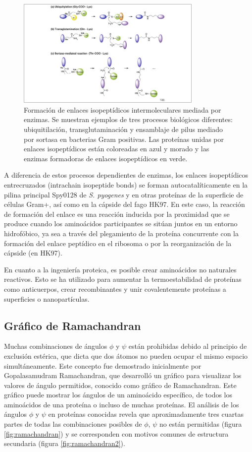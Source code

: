 \begin{figure}[h]
\centering
\includegraphics[width = 0.8\textwidth]{figs/iso.jpg}
\caption{Formación de enlaces isopeptídicos intermoleculares mediada por enzimas. Se muestran ejemplos de tres procesos biológicos diferentes: ubiquitilación, transglutaminación y ensamblaje de pilus mediado por sortasa en bacterias Gram positivas. Las proteínas unidas por enlaces isopeptídicos están coloreadas en azul y morado y las enzimas formadoras de enlaces isopeptídicos en verde.}
\label{fig:iso}
\end{figure}

A diferencia de estos procesos dependientes de enzimas, los enlaces isopeptídicos entrecruzados (intrachain isopeptide bonds) se forman autocatalíticamente en la pilina principal Spy0128 de \textit{S. pyogenes} y en otras proteínas de la superficie de células Gram+, así como en la cápside del fago HK97. En este caso, la reacción de formación del enlace es una reacción inducida por la proximidad que se produce cuando los aminoácidos participantes se sitúan juntos en un entorno hidrofóbico, ya sea a través del plegamiento de la proteína concurrente con la formación del enlace peptídico en el ribosoma o por la reorganización de la cápside (en HK97).

En cuanto a la ingeniería proteica, es posible crear aminoácidos no naturales reactivos. Esto se ha utilizado para aumentar la termoestabilidad de proteínas como anticuerpos, crear recombinantes y unir covalentemente proteínas a superficies o nanopartículas.

\subsection{Gráfico de Ramachandran}
Muchas combinaciones de ángulos $\phi$ y $\psi$ están prohibidas debido al principio de exclusión estérica, que dicta que dos átomos no pueden ocupar el mismo espacio simultáneamente. Este concepto fue demostrado inicialmente por Gopalasamudram Ramachandran, que desarrolló un gráfico para visualizar los valores de ángulo permitidos, conocido como gráfico de Ramachandran. Este gráfico puede mostrar los ángulos de un aminoácido específico, de todos los aminoácidos de una proteína o incluso de muchas proteínas. El análisis de los ángulos $\phi$ y $\psi$ en proteínas conocidas revela que aproximadamente tres cuartas partes de todas las combinaciones posibles de $\phi$, $\psi$ no están permitidas (figura \ref{fig:ramachandran}) y se corresponden con motivos comunes de estructura secundaria (figura \ref{fig:ramachandran2}).

